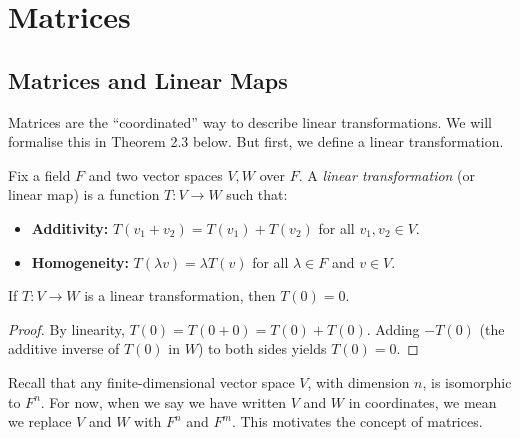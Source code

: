 \documentclass[../linear_algebra_and_groups.tex]{subfiles}
\begin{document}
\chapter{Matrices}


\section{Matrices and Linear Maps}

Matrices are the ``coordinated'' way to describe linear transformations. We will formalise this in Theorem 2.3 below. But first, we define a linear transformation.


\begin{definition}
    \begin{shaded*}
        Fix a field $F$ and two vector spaces $V,W$ over $F$. A \textit{linear transformation} (or linear map) is a function $T:V\to W$ such that:
        \begin{itemize}
            \item \textbf{Additivity:} $T(v_1+v_2)=T(v_1)+T(v_2)$ for all $v_1,v_2\in V$.
            \item \textbf{Homogeneity:} $T(\lambda v)=\lambda T(v)$ for all $\lambda\in F$ and $v\in V$.
        \end{itemize}
    \end{shaded*}
\end{definition}

\begin{lemma}
    \begin{shaded*}
        If $T: V \to W$ is a linear transformation, then $T(0) = 0$.
    \end{shaded*}
\end{lemma}
\begin{proof}
    By linearity, $T(0)=T(0+0)=T(0)+T(0)$. Adding $-T(0)$ (the additive inverse of $T(0)$ in $W$) to both sides yields $T(0)=0$.
    \qedhere
\end{proof}

Recall that any finite-dimensional vector space $V$, with dimension $n$, is isomorphic to $F^n$. For now, when we say we have written $V$ and $W$ in coordinates, we mean we replace $V$ and $W$ with $F^n$ and $F^m$. This motivates the concept of matrices.
\end{document}
